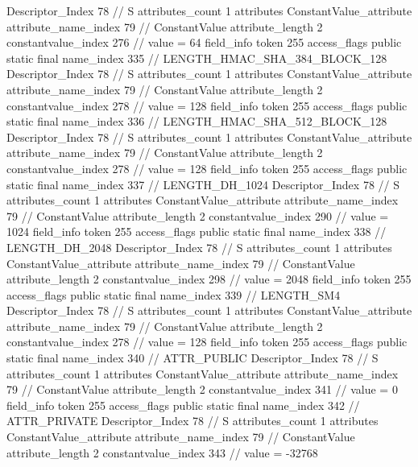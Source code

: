 {{{{{				Descriptor_Index	78		// S
				attributes_count	1
				attributes {
				ConstantValue_attribute {
					attribute_name_index	79		// ConstantValue
					attribute_length	2
					constantvalue_index	276		// value = 64
				}
				}
			}
			field_info {
				token	255
				access_flags	public static final
				name_index	335		// LENGTH_HMAC_SHA_384_BLOCK_128
				Descriptor_Index	78		// S
				attributes_count	1
				attributes {
				ConstantValue_attribute {
					attribute_name_index	79		// ConstantValue
					attribute_length	2
					constantvalue_index	278		// value = 128
				}
				}
			}
			field_info {
				token	255
				access_flags	public static final
				name_index	336		// LENGTH_HMAC_SHA_512_BLOCK_128
				Descriptor_Index	78		// S
				attributes_count	1
				attributes {
				ConstantValue_attribute {
					attribute_name_index	79		// ConstantValue
					attribute_length	2
					constantvalue_index	278		// value = 128
				}
				}
			}
			field_info {
				token	255
				access_flags	public static final
				name_index	337		// LENGTH_DH_1024
				Descriptor_Index	78		// S
				attributes_count	1
				attributes {
				ConstantValue_attribute {
					attribute_name_index	79		// ConstantValue
					attribute_length	2
					constantvalue_index	290		// value = 1024
				}
				}
			}
			field_info {
				token	255
				access_flags	public static final
				name_index	338		// LENGTH_DH_2048
				Descriptor_Index	78		// S
				attributes_count	1
				attributes {
				ConstantValue_attribute {
					attribute_name_index	79		// ConstantValue
					attribute_length	2
					constantvalue_index	298		// value = 2048
				}
				}
			}
			field_info {
				token	255
				access_flags	public static final
				name_index	339		// LENGTH_SM4
				Descriptor_Index	78		// S
				attributes_count	1
				attributes {
				ConstantValue_attribute {
					attribute_name_index	79		// ConstantValue
					attribute_length	2
					constantvalue_index	278		// value = 128
				}
				}
			}
			field_info {
				token	255
				access_flags	public static final
				name_index	340		// ATTR_PUBLIC
				Descriptor_Index	78		// S
				attributes_count	1
				attributes {
				ConstantValue_attribute {
					attribute_name_index	79		// ConstantValue
					attribute_length	2
					constantvalue_index	341		// value = 0
				}
				}
			}
			field_info {
				token	255
				access_flags	public static final
				name_index	342		// ATTR_PRIVATE
				Descriptor_Index	78		// S
				attributes_count	1
				attributes {
				ConstantValue_attribute {
					attribute_name_index	79		// ConstantValue
					attribute_length	2
					constantvalue_index	343		// value = -32768
}}}}}}}
